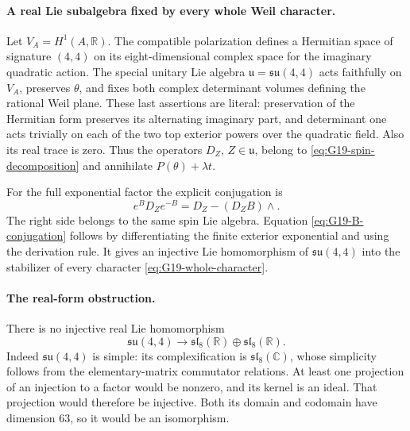 \paragraph{A real Lie subalgebra fixed by every whole Weil character.}
Let \(V_A=H^1(A,\mathbb R)\). The compatible polarization defines
a Hermitian space of signature \((4,4)\) on its eight-dimensional
complex space for the imaginary quadratic action. The special unitary
Lie algebra \(\mathfrak u=\mathfrak{su}(4,4)\) acts faithfully on
\(V_A\), preserves \(\theta\), and fixes both complex determinant
volumes defining the rational Weil plane. These last assertions are
literal: preservation of the Hermitian form preserves its alternating
imaginary part, and determinant one acts trivially on each of the two
top exterior powers over the quadratic field. Also its real trace is zero.
Thus the operators \(D_Z\), \(Z\in\mathfrak u\), belong to
\eqref{eq:G19-spin-decomposition} and annihilate
\(P(\theta)+\lambda t\).

For the full exponential factor the explicit conjugation is
\begin{equation}\label{eq:G19-B-conjugation}
       e^B D_Z e^{-B}=D_Z-(D_ZB)\wedge.
\end{equation}
The right side belongs to the same spin Lie algebra. Equation
\eqref{eq:G19-B-conjugation} follows by differentiating the finite
exterior exponential and using the derivation rule. It gives an injective
Lie homomorphism of \(\mathfrak{su}(4,4)\) into the stabilizer of
every character \eqref{eq:G19-whole-character}.

\paragraph{The real-form obstruction.}
There is no injective real Lie homomorphism
\[
 \mathfrak{su}(4,4)\longrightarrow
 \mathfrak{sl}_8(\mathbb R)\oplus\mathfrak{sl}_8(\mathbb R).
\]
Indeed \(\mathfrak{su}(4,4)\) is simple: its complexification is
\(\mathfrak{sl}_8(\mathbb C)\), whose simplicity follows from
the elementary-matrix commutator relations. At least one projection
of an injection to a factor would be nonzero, and its kernel is an
ideal. That projection would therefore be injective. Both its domain
and codomain have dimension 63, so it would be an isomorphism.

